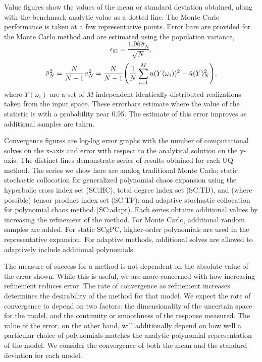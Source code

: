 Value figures show the values of the mean or standard deviation obtained, along with the benchmark analytic
value as a dotted line.  The Monte Carlo performance is taken at a few representative points.  Error bars are provided
for the Monte Carlo method and are estimated using the population variance,
\begin{equation}
  \epsilon_{95} = \frac{1.96\bar\sigma_N}{\sqrt{N}},
\end{equation}
\begin{equation}
  \bar\sigma_N^2 = \frac{N}{N-1}\sigma^2_N = \frac{N}{N-1}\qty(\frac{1}{N}\sum_{i=1}^M u(Y(\omega_i))^2 - \bar
  u(Y)^2_N),
\end{equation}
where $Y(\omega_i)$ are a set of $M$ independent identically-distributed realizations taken from the input space.
These errorbars estimate where the value of the statistic is with a probability near 0.95.  The estimate of
this error improves as additional samples are taken.

Convergence figures are
log-log error graphs with the number of computational solves on the x-axis and error with respect to the analytical
solution on the y-axis.  The distinct lines demonstrate series of results obtained for each UQ method.  
The series we show here are analog traditional Monte Carlo; static 
stochastic collocation for generalized polynomial chaos expansion using the hyperbolic
cross index set (SC:HC), total degree index set (SC:TD), and (where possible) tensor product index set (SC:TP); 
and adaptive stochastic collocation for polynomial
chaos method (SC:adapt).
Each
series obtains additional values by increasing the refinement of the method.  For Monte Carlo, additional
random samples are added.  For static SCgPC, higher-order polynomials are used in the representative expansion.  For
adaptive methods, additional solves are allowed to adaptively include additional polynomials.

The measure of success for a method is not dependent on the absolute value of the error shown.  While this is
useful, we are more concerned with how increasing refinement reduces error.  The
rate of convergence as refinement increases determines the desirability of the method for that model.  We
expect the rate of convergence to depend on two factors: the dimensionality of the uncertain space for the
model, and the continuity or smoothness of the response measured.  The value of the error, on the other hand, will additionally
depend on how well a particular choice of polynomials matches the analytic polynomial representation of the model.
We consider the convergence of both the mean and the standard deviation for each model.

